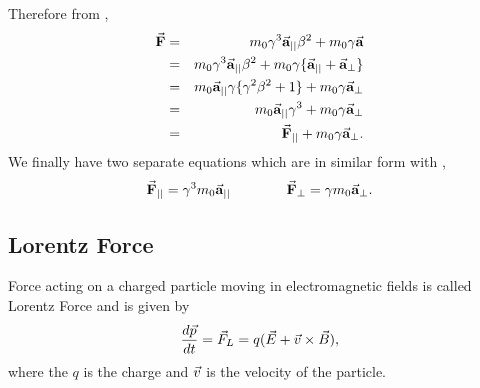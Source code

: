 \documentclass{article}
\begin{document}
Therefore from ,
\begin{eqnarray}
    \vec{\textbf{F}}  &=& m_0 \gamma^3 \vec{\textbf{a}}_{||} \beta^2 + m_0 \gamma \vec{\textbf{a}} \\
                    &=& m_0 \gamma^3 \vec{\textbf{a}}_{||} \beta^2 + m_0 \gamma \{ \vec{\textbf{a}}_{||} +  \vec{\textbf{a}}_{\perp} \} \\
                    &=& m_0 \vec{\textbf{a}}_{||} \gamma \{ \gamma^2\beta^2 + 1 \} + m_0 \gamma \vec{\textbf{a}}_{\perp} \\
                    &=& m_0 \vec{\textbf{a}}_{||} \gamma^3 + m_0 \gamma \vec{\textbf{a}}_{\perp} \\
                    &=& \vec{\textbf{F}}_{||} + m_0 \gamma \vec{\textbf{a}}_{\perp} .
\end{eqnarray}
We finally have two separate equations which are in similar form with ,
\begin{equation} \label{eq:Frel_para_and_perp}
    \begin{aligned}
        \vec{\textbf{F}}_{||} = \gamma^3  m_0 \vec{\textbf{a}}_{||}
    \end{aligned}
    \qquad \qquad
    \begin{aligned}
        \vec{\textbf{F}}_{\perp} = \gamma  m_0\vec{\textbf{a}}_{\perp} .
    \end{aligned}
\end{equation}

\subsection{Lorentz Force} \label{sec:lorentz-force}
Force acting on a charged particle moving in electromagnetic fields is called Lorentz Force and is given by 
\begin{equation} \label{eq:lf}
    \frac{d \vec{p}}{d t} = \vec{F}_L=q(\vec{E}+ \vec{v} \times \vec{B}) , 
\end{equation}
where the $q$ is the charge and $\vec{v}$ is the velocity of the particle. 
\end{document}
